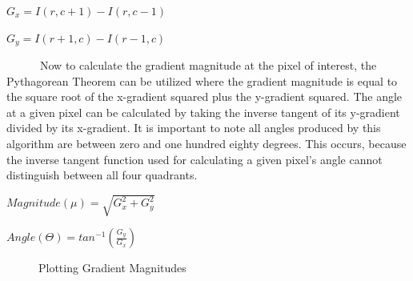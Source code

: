 \documentclass[
  letterpaper,
]{report}
\begin{document}
\(G_x=I(r,c+1)−I(r,c-1)\)

\(G_y=I(r+1,c)−I(r-1,c)\)

~~~~~~Now to calculate the gradient magnitude at the pixel of interest,
the Pythagorean Theorem can be utilized where the gradient magnitude is
equal to the square root of the x-gradient squared plus the y-gradient
squared. The angle at a given pixel can be calculated by taking the
inverse tangent of its y-gradient divided by its x-gradient. It is
important to note all angles produced by this algorithm are between zero
and one hundred eighty degrees. This occurs, because the inverse tangent
function used for calculating a given pixel's angle cannot distinguish
between all four quadrants.

\(Magnitude(\mu)=\sqrt{G_{x}^{2} + G_{y}^{2}}\)

\(Angle(\Theta)=tan^{−1} (\frac{G_y}{G_x})\)

\begin{figure}

\begin{minipage}[t]{\linewidth}

{\centering 


}

\end{minipage}%

\caption{\label{fig-mag_plot}Plotting Gradient Magnitudes}

\end{figure}
\end{document}
